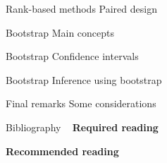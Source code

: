 \documentclass[t]{beamer}
\begin{document}

\begin{ftst}
{Rank-based methods}
{Paired design}

\end{ftst}

\begin{ftst}
{Bootstrap}
{Main concepts}

\end{ftst}


\begin{ftst}
{Bootstrap}
{Confidence intervals}

\end{ftst}


\begin{ftst}
{Bootstrap}
{Inference using bootstrap}

\end{ftst}


\begin{ftst}
{Final remarks}
{Some considerations}

\end{ftst}



\begin{ftst}
{Bibliography}
{\ }
\scriptsize
\textbf{Required reading}

\benums  %
\eenum

\textbf{Recommended reading}

\benums %
\item %
\eenum
\end{ftst}

\end{document}
